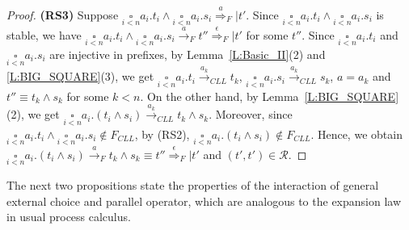 \documentclass{elsarticle}
\theoremstyle{plain}
\theoremstyle{definition}
\begin{document}
\begin{proof}
\textbf{(RS3)} Suppose $\underset{i< n}{\square}a_i.t_i \wedge \underset{i< n}{\square}a_i.s_i \stackrel{a}{\Longrightarrow}_F |t'$.
Since $\underset{i< n}{\square}a_i.t_i \wedge \underset{i< n}{\square}a_i.s_i$ is stable, we have $\underset{i< n}{\square}a_i.t_i \wedge \underset{i< n}{\square}a_i.s_i \stackrel{a}{\longrightarrow}_F t''  \stackrel{\epsilon}{\Longrightarrow}_F |t'$ for some $t''$.
Since $\underset{i<n}\square a_i.t_i$ and $\underset{i<n} \square a_i.s_i$ are injective in prefixes, by Lemma~\ref{L:Basic_II}(2) and \ref{L:BIG_SQUARE}(3), we get $\underset{i< n}{\square}a_i.t_i \stackrel{a_k}{\longrightarrow}_{CLL} t_k$, $\underset{i< n}{\square}a_i.s_i \stackrel{a_k}{\longrightarrow}_{CLL} s_k$, $a = a_k$ and $t'' \equiv t_k \wedge s_k$ for some $k<n$.
On the other hand, by Lemma~\ref{L:BIG_SQUARE}(2), we get $\underset{i< n} {\square}a_i.(t_i \wedge s_i) \stackrel{a_k}{\longrightarrow}_{CLL} t_k \wedge s_k$.
Moreover, since $\underset{i< n}{\square}a_i.t_i \wedge \underset{i< n}{\square}a_i.s_i \notin F_{CLL}$, by (RS2), $\underset{i< n} {\square}a_i.(t_i \wedge s_i) \notin F_{CLL}$.
Hence, we obtain $\underset{i< n} {\square}a_i.(t_i \wedge s_i) \stackrel{a}{\longrightarrow}_F t_k\wedge s_k \equiv t''  \stackrel{\epsilon}{\Longrightarrow}_F |t' $ and $(t',t')\in {\mathcal R}$.
\end{proof}

The next two propositions state the properties of the interaction of general external choice and parallel operator, which are analogous to the expansion law in usual process calculus.
\end{document}
